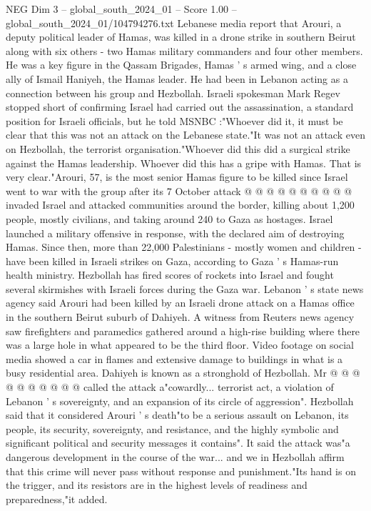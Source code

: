 \begin{textsample}{NEG Dim 3 – global\_south\_2024\_01 – Score 1.00 – global\_south\_2024\_01/104794276.txt}  \label{ex:f3_neg_109}
Lebanese media report that Arouri, a deputy political leader of Hamas, was killed in a drone strike in southern Beirut along with six others - two Hamas military commanders and four other members.
He was a key figure in the Qassam Brigades, Hamas ' s armed wing, and a close ally of Ismail Haniyeh, the Hamas leader.
He had been in Lebanon acting as a connection between his group and Hezbollah.
Israeli spokesman Mark Regev stopped short of confirming Israel had carried out the assassination, a standard position for Israeli officials, but he told MSNBC :"Whoever did it, it must be clear that this was not an attack on the Lebanese state."It was not an attack even on Hezbollah, the terrorist organisation."Whoever did this did a surgical strike against the Hamas leadership.
Whoever did this has a gripe with Hamas.
That is very clear."Arouri, 57, is the most senior Hamas figure to be killed since Israel went to war with the group after its 7 October attack @ @ @ @ @ @ @ @ @ @ invaded Israel and attacked communities around the border, killing about 1,200 people, mostly civilians, and taking around 240 to Gaza as hostages.
Israel launched a military offensive in response, with the declared aim of destroying Hamas.
Since then, more than 22,000 Palestinians - mostly women and children - have been killed in Israeli strikes on Gaza, according to Gaza ' s Hamas-run health ministry.
Hezbollah has fired scores of rockets into Israel and fought several skirmishes with Israeli forces during the Gaza war.
Lebanon ' s state news agency said Arouri had been killed by an Israeli drone attack on a Hamas office in the southern Beirut suburb of Dahiyeh.
A witness from Reuters news agency saw firefighters and paramedics gathered around a high-rise building where there was a large hole in what appeared to be the third floor.
Video footage on social media showed a car in flames and extensive damage to buildings in what is a busy residential area.
Dahiyeh is known as a stronghold of Hezbollah.
Mr @ @ @ @ @ @ @ @ @ @ called the attack a"cowardly... terrorist act, a violation of Lebanon ' s sovereignty, and an expansion of its circle of aggression".
Hezbollah said that it considered Arouri ' s death"to be a serious assault on Lebanon, its people, its security, sovereignty, and resistance, and the highly symbolic and significant political and security messages it contains".
It said the attack was"a dangerous development in the course of the war... and we in Hezbollah affirm that this crime will never pass without response and punishment."Its hand is on the trigger, and its resistors are in the highest levels of readiness and preparedness,"it added.

\end{textsample}
